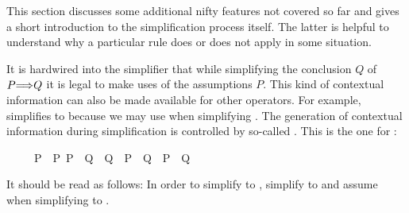 %
\begin{isabellebody}%
\def\isabellecontext{simp}%
%
%
\begin{isamarkuptext}%
\label{sec:simplification-II}
This section discusses some additional nifty features not covered so far and
gives a short introduction to the simplification process itself. The latter
is helpful to understand why a particular rule does or does not apply in some
situation.%
\end{isamarkuptext}%
%
%
%
\begin{isamarkuptext}%
\label{sec:simp-cong}
It is hardwired into the simplifier that while simplifying the conclusion $Q$
of $P \emph{$\Longrightarrow$} Q$ it is legal to make uses of the assumptions $P$. This
kind of contextual information can also be made available for other
operators. For example,  simplifies to  because we may use  when simplifying . The generation of contextual information during simplification is
controlled by so-called . This is the one for
\isa{{\isasymlongrightarrow}}:
\begin{isabelle}%
\ \ \ \ \ {\isasymlbrakk}P\ {\isacharequal}\ P{\isacharprime}{\isacharsemicolon}\ P{\isacharprime}\ {\isasymLongrightarrow}\ Q\ {\isacharequal}\ Q{\isacharprime}{\isasymrbrakk}\ {\isasymLongrightarrow}\ {\isacharparenleft}P\ {\isasymlongrightarrow}\ Q{\isacharparenright}\ {\isacharequal}\ {\isacharparenleft}P{\isacharprime}\ {\isasymlongrightarrow}\ Q{\isacharprime}{\isacharparenright}%
\end{isabelle}
It should be read as follows:
In order to simplify  to ,
simplify  to 
and assume  when simplifying  to .


\end{isamarkuptext}
\end{isabellebody}
